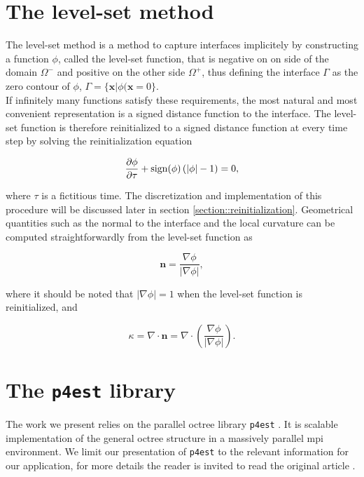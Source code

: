 \section{The level-set method}

\indent The level-set method is a method to capture interfaces implicitely by constructing a function $\phi$, called the level-set function, that is negative on on side of the domain $\Omega^-$ and positive on the other side $\Omega^+$, thus defining the interface $\Gamma$ as the zero contour of $\phi$, $\Gamma = \{\mathbf{x} \vert \phi(\mathbf{x}=0\}$.\\

If infinitely many functions satisfy these requirements, the most natural and most convenient representation is a signed distance function to the interface. The level-set function is therefore reinitialized to a signed distance function at every time step by solving the reinitialization equation

\begin{equation} \label{eq::reinitialization}
\frac{\partial \phi}{\partial \tau} + \mathrm{sign}(\phi) \left( \lvert \phi \rvert - 1 \right) = 0,
\end{equation}

where $\tau$ is a fictitious time. The discretization and implementation of this procedure will be discussed later in section \ref{section::reinitialization}. Geometrical quantities such as the normal to the interface and the local curvature can be computed straightforwardly from the level-set function as

\begin{equation*}
\mathbf{n} = \frac{\nabla \phi}{\lvert \nabla \phi \rvert},
\end{equation*}

where it should be noted that $\lvert \nabla \phi \rvert = 1$ when the level-set function is reinitialized, and

\begin{equation*}
\kappa = \nabla \cdot \mathbf{n} =  \nabla \cdot \left( \frac{\nabla \phi}{\lvert \nabla \phi \rvert} \right).
\end{equation*}


\section{The \texttt{p4est} library}

The work we present relies on the parallel octree library \texttt{p4est} \cite{burstedded:2011:p4est}. It is scalable implementation of the general octree structure in a massively parallel mpi environment. We limit our presentation of \texttt{p4est} to the relevant information for our application, for more details the reader is invited to read the original article \cite{burstedded:2011:p4est}.

